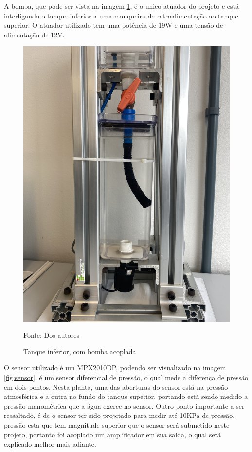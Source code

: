 A bomba, que pode ser vista na imagem \ref{fig:tanque_inf}, é o unico atuador do projeto e está interligando o tanque inferior a uma manqueira de retroalimentação ao tanque superior. O atuador utilizado tem uma potência de 19W e uma tensão de alimentação de 12V.

\begin{figure}[H]
        \centering\footnotesize
        \caption{Tanque inferior, com bomba acoplada}
        \begin{center}
            \includegraphics[scale=0.1]{imagens/tanque_inferior.jpg}
        \end{center}
        \label{fig:tanque_inf}
        \par Fonte: Dos autores
    \end{figure}

O sensor utilizado é um MPX2010DP, podendo ser visualizado na imagem \ref{fig:sensor}, é um sensor diferencial de pressão, o qual mede a diferença de pressão em dois pontos. Nesta planta, uma das aberturas do sensor está na pressão atmosférica e a outra no fundo do tanque superior, portando está sendo medido a pressão manométrica que a água exerce no sensor. Outro ponto importante a ser ressaltado, é de o sensor ter sido projetado para medir até 10KPa de pressão, pressão esta que tem magnitude superior que o sensor será submetido neste projeto, portanto foi acoplado um amplificador em sua saída, o qual será explicado melhor mais adiante.

